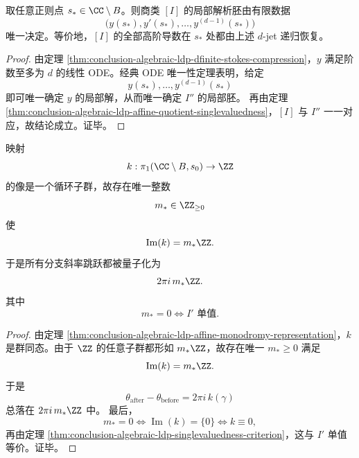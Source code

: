 \begin{corollary}\label{cor:conclusion-algebraic-ldp-local-djet-determines-affine-class}
取任意正则点 \(s_\ast\in \CC\setminus B\)。则商类 \([I]\) 的局部解析胚由有限数据
\[
\bigl(y(s_\ast),y'(s_\ast),\dots,y^{(d-1)}(s_\ast)\bigr)
\]
唯一决定。等价地，\([I]\) 的全部高阶导数在 \(s_\ast\) 处都由上述 \(d\)-jet 递归恢复。
\end{corollary}
\begin{proof}
由定理 \ref{thm:conclusion-algebraic-ldp-dfinite-stokes-compression}，\(y\) 满足阶数至多为 \(d\) 的线性 ODE。经典 ODE 唯一性定理表明，给定
\[
y(s_\ast),\dots,y^{(d-1)}(s_\ast)
\]
即可唯一确定 \(y\) 的局部解，从而唯一确定 \(I''\) 的局部胚。
再由定理 \ref{thm:conclusion-algebraic-ldp-affine-quotient-singlevaluedness}，\([I]\) 与 \(I''\) 一一对应，故结论成立。证毕。
\end{proof}

\begin{theorem}\label{thm:conclusion-algebraic-ldp-stokes-slope-quantization}
映射
\[
k:\pi_1(\CC\setminus B,s_0)\to \ZZ
\]
的像是一个循环子群，故存在唯一整数
\[
m_\ast\in \ZZ_{\ge 0}
\]
使
\[
\operatorname{Im}(k)=m_\ast \ZZ.
\]
于是所有分支斜率跳跃都被量子化为
\[
2\pi i\,m_\ast\ZZ.
\]
其中
\[
m_\ast=0
\iff
I' \text{ 单值}.
\]
\end{theorem}
\begin{proof}
由定理 \ref{thm:conclusion-algebraic-ldp-affine-monodromy-representation}，\(k\) 是群同态。由于 \(\ZZ\) 的任意子群都形如 \(m_\ast \ZZ\)，故存在唯一 \(m_\ast\ge 0\) 满足
\[
\operatorname{Im}(k)=m_\ast \ZZ.
\]
于是
\[
\theta_{\mathrm{after}}-\theta_{\mathrm{before}}=2\pi i\,k(\gamma)
\]
总落在 \(2\pi i\,m_\ast\ZZ\) 中。
最后，
\[
m_\ast=0
\iff
\operatorname{Im}(k)=\{0\}
\iff
k\equiv 0,
\]
再由定理 \ref{thm:conclusion-algebraic-ldp-singlevaluedness-criterion}，这与 \(I'\) 单值等价。证毕。
\end{proof}

